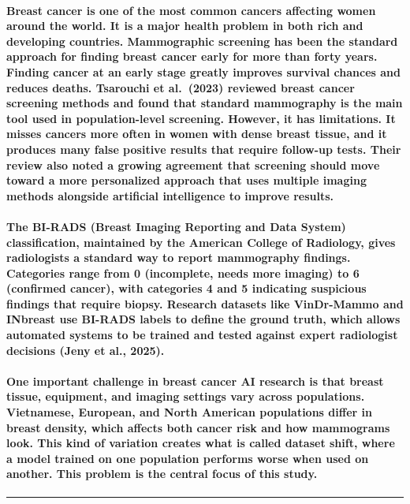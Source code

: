 \paragraph{Breast cancer is one of the most common cancers affecting women around the world. It is a major health problem in both rich and developing countries. Mammographic screening has been the standard approach for finding breast cancer early for more than forty years. Finding cancer at an early stage greatly improves survival chances and reduces deaths. Tsarouchi et al. (2023) reviewed breast cancer screening methods and found that standard mammography is the main tool used in population-level screening. However, it has limitations. It misses cancers more often in women with dense breast tissue, and it produces many false positive results that require follow-up tests. Their review also noted a growing agreement that screening should move toward a more personalized approach that uses multiple imaging methods alongside artificial intelligence to improve results.}

\paragraph{The BI-RADS (Breast Imaging Reporting and Data System) classification, maintained by the American College of Radiology, gives radiologists a standard way to report mammography findings. Categories range from 0 (incomplete, needs more imaging) to 6 (confirmed cancer), with categories 4 and 5 indicating suspicious findings that require biopsy. Research datasets like VinDr-Mammo and INbreast use BI-RADS labels to define the ground truth, which allows automated systems to be trained and tested against expert radiologist decisions (Jeny et al., 2025).}

\paragraph{One important challenge in breast cancer AI research is that breast tissue, equipment, and imaging settings vary across populations. Vietnamese, European, and North American populations differ in breast density, which affects both cancer risk and how mammograms look. This kind of variation creates what is called dataset shift, where a model trained on one population performs worse when used on another. This problem is the central focus of this study.}

\begin{center}\rule{0.5\linewidth}{0.5pt}\end{center}


